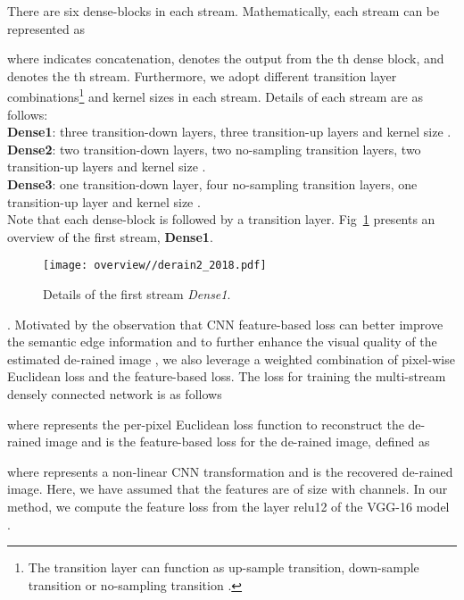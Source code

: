 \documentclass[10pt,twocolumn,letterpaper]{article}
\begin{document}
 
There are six dense-blocks in  each stream. Mathematically, each stream can be represented as

where  indicates concatenation,  denotes the output from the th dense block, and  denotes the th stream. Furthermore, we adopt different transition layer combinations\footnote{The transition layer can function as up-sample transition, down-sample transition or no-sampling transition \cite{dense_fully}.} and kernel sizes in each stream.  Details of each stream are as follows:\\
 \noindent \textbf{Dense1}: three transition-down layers, three transition-up layers and kernel size .\\ 
 \noindent \textbf{Dense2}: two transition-down layers, two no-sampling transition layers, two transition-up layers and kernel size .\\
 \noindent \textbf{Dense3}: one transition-down layer, four no-sampling transition layers, one transition-up layer and kernel size .\\
 Note that each dense-block is followed by a transition layer.   Fig~\ref{fig:multi_column} presents an overview of the first stream, \textbf{Dense1}.\\
 
  \begin{figure}[htp!]
 	\centering
 	\begin{minipage}{0.45\textwidth}
 		\texttt{[image: overview//derain2\_2018.pdf]}
 		\captionsetup{labelformat=empty}
 		\captionsetup{justification=centering}
 	\end{minipage}
 	\vskip-10pt
 	\caption{Details of the first stream \emph{Dense1}.} 
 	\label{fig:multi_column}
 \end{figure}


 
. Motivated by the observation that CNN feature-based loss can better improve the semantic edge information  \cite{perceptual_loss,SR_photorea} and to further enhance the visual quality of the estimated de-rained image \cite{derain_2017_zhang}, we also leverage a weighted combination of pixel-wise Euclidean loss and the feature-based loss. The loss for training the multi-stream densely connected network is as follows
 
where  represents the per-pixel Euclidean loss function to reconstruct the de-rained image and   is the feature-based loss for the de-rained image, defined as
 
 where  represents a non-linear CNN transformation and  is the recovered de-rained image. Here, we have assumed that the features are of size  with   channels.  In our method, we compute the feature loss from the layer relu12 of the VGG-16 model \cite{vgg}.
 
\end{document}
